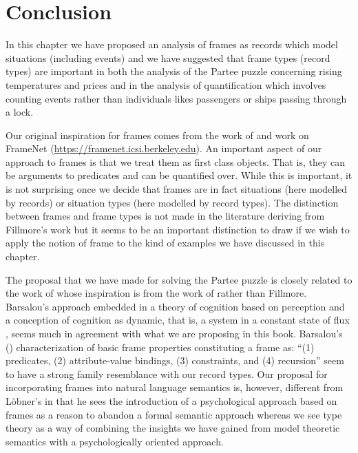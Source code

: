 \section{Conclusion}
In this chapter we have proposed an analysis of frames as records
which model situations (including events) and we have suggested that
frame types (record types) are important in both the analysis of the
Partee puzzle concerning rising temperatures and prices and in the
analysis of quantification which involves counting events rather than
individuals likes passengers or ships passing through a lock.

Our original inspiration for frames comes from the work of
\cite{Fillmore1982,Fillmore1985} and work on FrameNet
(\url{https://framenet.icsi.berkeley.edu}).  An important aspect of
our approach to frames is that we treat them as first class objects.
That is, they can be arguments to predicates and can be quantified
over.  While this is important, it is not surprising once we decide that
frames are in fact situations (here modelled by records) or situation
types (here modelled by record types).  The distinction between frames
and frame types is not made in the literature deriving from Fillmore's
work but it seems to be an important distinction to draw if we wish to
apply the notion of frame to the kind of examples we have discussed in
this chapter.

The proposal that we have made for solving the Partee puzzle is
closely related to the work of \cite{Lobner2014,Lobnerinprep} whose
inspiration is from the work of
\cite{Barsalou1992a,Barsalou1992,Barsalou1999} rather than Fillmore.
Barsalou's approach embedded in a theory of cognition based on
perception and a conception of cognition as dynamic, that is, a system
in a constant state of flux \citep{PrinzBarsalou2014}, seems much in
agreement with what we are proposing in this book.  Barsalou's
(\citeyear{Barsalou1999}) characterization of basic frame properties
constituting a frame as: ``(1) predicates, (2) attribute-value
bindings, (3) constraints, and (4) recursion'' seem to have a strong
family resemblance with our record types.  Our proposal for
incorporating frames into natural language semantics is, however,
different from Löbner's in that he sees the introduction of a
psychological approach based on frames as a reason to abandon a formal
semantic approach whereas we see type theory as a way of combining the
insights we have gained from model theoretic semantics with a
psychologically oriented approach.  

